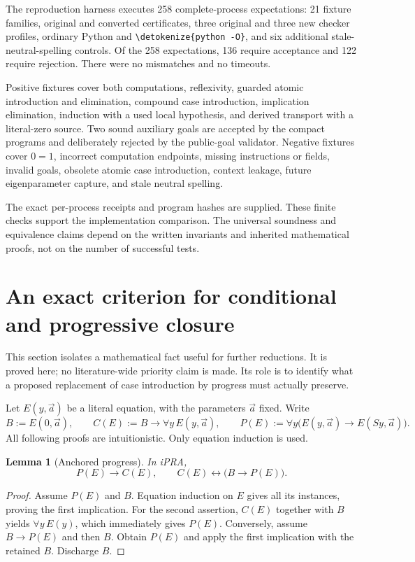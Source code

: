 \documentclass[11pt,letterpaper]{article}
\newtheorem{lemma}[theorem]{Lemma}
\theoremstyle{definition}
\theoremstyle{remark}
\newcommand{\file}[1]{\expandafter\nolinkurl\expandafter{\detokenize{#1}}}
\begin{document}
The reproduction harness executes 258 complete-process expectations:
21 fixture families, original and converted certificates, three original
and three new checker profiles, ordinary Python and \file{python -O},
and six additional stale-neutral-spelling controls. Of the 258 expectations,
136 require acceptance and 122 require rejection. There were no mismatches
and no timeouts.

Positive fixtures cover both computations, reflexivity, guarded atomic
introduction and elimination, compound case introduction, implication
elimination, induction with a used local hypothesis, and derived transport
with a literal-zero source. Two sound auxiliary goals are accepted by the
compact programs and deliberately rejected by the public-goal validator.
Negative fixtures cover $0=1$, incorrect computation endpoints, missing
instructions or fields, invalid goals, obsolete atomic case introduction,
context leakage, future eigenparameter capture, and stale neutral spelling.

The exact per-process receipts and program hashes are supplied. These
finite checks support the implementation comparison. The universal
soundness and equivalence claims depend on the written invariants and
inherited mathematical proofs, not on the number of successful tests.

\section{An exact criterion for conditional and progressive closure}
\label{sec:criterion}

This section isolates a mathematical fact useful for further reductions.
It is proved here; no literature-wide priority claim is made. Its role is
to identify what a proposed replacement of case introduction by progress
must actually preserve.

Let $E(y,\vec a)$ be a literal equation, with the parameters $\vec a$
fixed. Write
\[
 B:=E(0,\vec a),\qquad
 C(E):=B\to\forall y\,E(y,\vec a),\qquad
 P(E):=\forall y\bigl(E(y,\vec a)\to E(Sy,\vec a)\bigr).
\]
All following proofs are intuitionistic. Only equation induction is used.

\begin{lemma}[Anchored progress]
In iPRA,
\[
 P(E)\to C(E),\qquad
 C(E)\leftrightarrow\bigl(B\to P(E)\bigr).
\]
\end{lemma}
\begin{proof}
Assume $P(E)$ and $B$. Equation induction on $E$ gives all its instances,
proving the first implication. For the second assertion, $C(E)$ together
with $B$ yields $\forall y\,E(y)$, which immediately gives $P(E)$.
Conversely, assume $B\to P(E)$ and then $B$. Obtain $P(E)$ and apply the
first implication with the retained $B$. Discharge $B$.
\end{proof}
\end{document}
